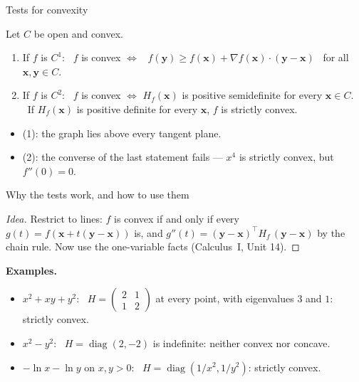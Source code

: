 \documentclass[10pt]{wosm-slides}
\newcommand{\vx}{\mathbf{x}}
\newcommand{\vy}{\mathbf{y}}
\begin{document}
\begin{frame}{Tests for convexity}
  \begin{theorem}
    Let $C$ be open and convex.
    \begin{enumerate}
      \item If $f$ is $C^1$: \ $f$ is convex $\iff$ \
        $f(\vy) \ge f(\vx) + \nabla f(\vx) \cdot (\vy - \vx)$ \ for all $\vx, \vy \in C$.
      \item If $f$ is $C^2$: \ $f$ is convex $\iff$ $H_f(\vx)$ is positive semidefinite for every
        $\vx \in C$. \ If $H_f(\vx)$ is positive definite for every $\vx$, $f$ is strictly convex.
    \end{enumerate}
  \end{theorem}
  \begin{itemize}
    \item (1): the graph lies above every tangent plane.
    \item (2): the converse of the last statement fails --- $x^4$ is strictly convex, but
      $f''(0) = 0$.
  \end{itemize}
\end{frame}

\begin{frame}{Why the tests work, and how to use them}
  \begin{proof}[Idea]
    Restrict to lines: $f$ is convex if and only if every $g(t) = f(\vx + t(\vy - \vx))$ is, and
    $g''(t) = (\vy - \vx)^\top H_f\, (\vy - \vx)$ by the chain rule. Now use the one-variable facts
    (Calculus~I, Unit 14).
  \end{proof}
  \pause
  \textbf{Examples.}
  \begin{itemize}
    \item $x^2 + xy + y^2$: \ $H = \left(\begin{smallmatrix} 2 & 1 \\ 1 & 2 \end{smallmatrix}\right)$
      at every point, with eigenvalues $3$ and $1$: strictly convex.
    \item $x^2 - y^2$: \ $H = \operatorname{diag}(2, -2)$ is indefinite: neither convex nor concave.
    \item $-\ln x - \ln y$ on $x, y > 0$: \ $H = \operatorname{diag}(1/x^2, 1/y^2)$: strictly convex.
  \end{itemize}
\end{frame}
\end{document}
